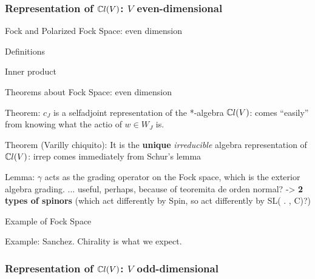 \subsubsection{Representation of $\mathbb C l(V)$: $V$ even-dimensional}

\begin{frame}{Fock and Polarized Fock Space: even dimension} %

    Definitions
    
    Inner product

\end{frame}

\begin{frame}{Theorems about Fock Space: even dimension} %

    Theorem: $c_J$ is a selfadjoint representation of the *-algebra $\mathbb C l(V)$: comes ``easily'' from knowing what the actio of $w \in W_J$ is.
    
    Theorem (Varilly chiquito): It is the \textbf{unique} \emph{irreducible} algebra representation of $\mathbb C l(V)$: irrep comes immediately from Schur's lemma
    
    Lemma: $\gamma$ acts as the grading operator on the Fock space, which is the exterior algebra grading. ... useful, perhaps, because of teoremita de orden normal? -> \textbf{2 types of spinors} (which act differently by Spin, so act differently by SL( . , C)?)

\end{frame}

\begin{frame}{Example of Fock Space} %

    Example: Sanchez. Chirality is what we expect.

\end{frame}

\subsubsection{Representation of $\mathbb C l(V)$: $V$ odd-dimensional}

